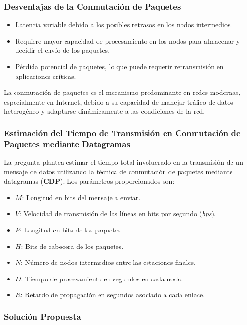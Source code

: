 \documentclass[a4paper,12pt]{article}
\begin{document}
\subsubsection*{Desventajas de la Conmutación de Paquetes}
\begin{itemize}
    \item Latencia variable debido a los posibles retrasos en los nodos intermedios.
    \item Requiere mayor capacidad de procesamiento en los nodos para almacenar y decidir el envío de los paquetes.
    \item Pérdida potencial de paquetes, lo que puede requerir retransmisión en aplicaciones críticas.
\end{itemize}

La conmutación de paquetes es el mecanismo predominante en redes modernas, especialmente en Internet, debido a su capacidad de manejar tráfico de datos heterogéneo y adaptarse dinámicamente a las condiciones de la red.


\subsubsection{Estimación del Tiempo de Transmisión en Conmutación de Paquetes mediante Datagramas}

La pregunta plantea estimar el tiempo total involucrado en la transmisión de un mensaje de datos utilizando la técnica de conmutación de paquetes mediante datagramas (\textbf{CDP}). Los parámetros proporcionados son:

\begin{itemize}
    \item \( M \): Longitud en bits del mensaje a enviar.
    \item \( V \): Velocidad de transmisión de las líneas en bits por segundo (\textit{bps}).
    \item \( P \): Longitud en bits de los paquetes.
    \item \( H \): Bits de cabecera de los paquetes.
    \item \( N \): Número de nodos intermedios entre las estaciones finales.
    \item \( D \): Tiempo de procesamiento en segundos en cada nodo.
    \item \( R \): Retardo de propagación en segundos asociado a cada enlace.
\end{itemize}

\subsubsection*{Solución Propuesta}
\end{document}
